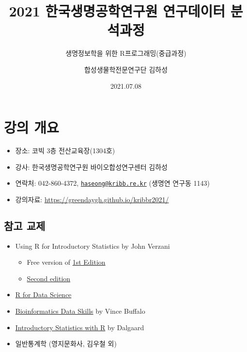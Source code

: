 \documentclass[
]{book}
\title{2021 한국생명공학연구원 연구데이터 분석과정}
\subtitle{생명정보학을 위한 R프로그래밍(중급과정)}
\author{합성생물학전문연구단 김하성}
\date{2021.07.08}
\providecommand{\tightlist}{%
  \setlength{\itemsep}{0pt}\setlength{\parskip}{0pt}}
\begin{document}
\maketitle

{
\setcounter{tocdepth}{1}
\tableofcontents
}
\hypertarget{introduction}{%
\chapter{강의 개요}\label{introduction}}

\begin{itemize}
\tightlist
\item
  장소: 코빅 3층 전산교육장(1304호)
\item
  강사: 한국생명공학연구원 바이오합성연구센터 김하성
\item
  연락처: 042-860-4372, \href{mailto:haseong@kribb.re.kr}{\nolinkurl{haseong@kribb.re.kr}} (생명연 연구동 1143)
\item
  강의자료: \url{https://greendaygh.github.io/kribbr2021/}
\end{itemize}

\hypertarget{References_n_books}{%
\section{참고 교제}\label{References_n_books}}

\begin{itemize}
\tightlist
\item
  Using R for Introductory Statistics by John Verzani

  \begin{itemize}
  \tightlist
  \item
    Free version of \href{https://cran.r-project.org/doc/contrib/Verzani-SimpleR.pdf}{1st Edition}
  \item
    \href{https://www.crcpress.com/Using-R-for-Introductory-Statistics-Second-Edition/Verzani/p/book/9781466590731}{Second edition}
  \end{itemize}
\item
  \href{https://r4ds.had.co.nz}{R for Data Science}
\item
  \href{http://2.droppdf.com/files/5aTvl/bioinformatics-data-skills.pdf}{Bioinformatics Data Skills} by Vince Buffalo
\item
  \href{http://www.academia.dk/BiologiskAntropologi/Epidemiologi/PDF/Introductory_Statistics_with_R__2nd_ed.pdf}{Introductory Statistics with R} by Dalgaard
\item
  일반통계학 (영지문화사, 김우철 외)
\end{itemize}
\end{document}
